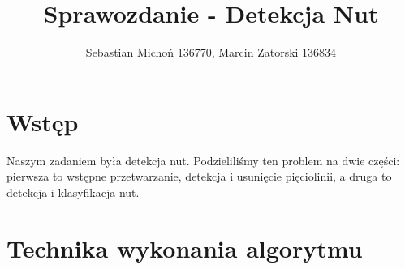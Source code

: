 \documentclass[12pt]{article}
\begin{document}
	\title{Sprawozdanie - Detekcja Nut}
	\author{Sebastian Michoń 136770, Marcin Zatorski 136834}
	\date{\vspace{-0ex}}
	\maketitle
	\section{Wstęp}
		Naszym zadaniem była detekcja nut. Podzieliliśmy ten problem na dwie części: pierwsza to wstępne przetwarzanie, detekcja i usunięcie pięciolinii, a druga to detekcja i klasyfikacja nut.
	\section{Technika wykonania algorytmu}
\end{document}
